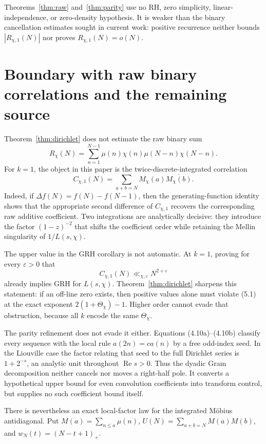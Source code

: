 \documentclass[11pt]{article}
\theoremstyle{remark}
\newcommand{\Rea}{\operatorname{Re}}
\newcommand{\GRH}{\mathrm{GRH}}
\newcommand{\eps}{\varepsilon}
\begin{document}
Theorems~\ref{thm:raw} and~\ref{thm:parity} use no RH, zero simplicity, linear-independence, or zero-density
hypothesis.  It is weaker than the binary cancellation estimates sought in current work:
positive recurrence neither bounds $|R_{\chi,1}(N)|$ nor proves $R_{\chi,1}(N)=o(N)$.

\section{Boundary with raw binary correlations and the remaining source}
\label{sec:boundary}

Theorem~\ref{thm:dirichlet} does not estimate the raw binary sum
\[
 R_\chi(N)=\sum_{n=1}^{N-1}\mu(n)\chi(n)\mu(N-n)\chi(N-n).
\]
For $k=1$, the object in this paper is the twice-discrete-integrated correlation
\[
 C_{\chi,1}(N)=\sum_{a+b=N}M_\chi(a)\overline{M_\chi(b)}.
\]
Indeed, if $\Delta f(N)=f(N)-f(N-1)$, then the generating-function identity shows that the
appropriate second difference of $C_{\chi,1}$ recovers the corresponding raw additive
coefficient.  Two integrations are analytically decisive: they introduce the factor
$(1-z)^{-2}$ that shifts the coefficient order while retaining the Mellin singularity of
$1/L(s,\chi)$.

The upper value in the $\GRH$ corollary is not automatic.  At $k=1$, proving for every
$\eps>0$ that
\begin{equation}
 C_{\chi,1}(N)\ll_{\chi,\eps}N^{2+\eps}
 \tag{5.1}
\end{equation}
already implies $\GRH$ for $L(s,\chi)$.  Theorem~\ref{thm:dirichlet} sharpens this statement:
if an off-line zero exists, then positive values alone must violate (5.1) at the exact exponent
$2(1+\Theta_\chi)-1$.  Higher order cannot evade that obstruction, because all $k$ encode the
same $\Theta_\chi$.

The parity refinement does not evade it either.  Equations (4.10a)--(4.10b) classify every
sequence with the local rule $a(2n)=ca(n)$ by a free odd-index seed.  In the Liouville case the
factor relating that seed to the full Dirichlet series is $1+2^{-s}$, an analytic unit throughout
$\Rea s>0$.  Thus the dyadic Gram decomposition neither cancels nor moves a right-half pole.
It converts a hypothetical upper bound for even convolution coefficients into transform control,
but supplies no such coefficient bound itself.

There is nevertheless an exact local-factor law for the integrated M\"obius antidiagonal.  Put
$M(a)=\sum_{n\leq a}\mu(n)$, $U(N)=\sum_{a+b=N}M(a)M(b)$, and
$w_N(t)=(N-t+1)_+$.
\end{document}
